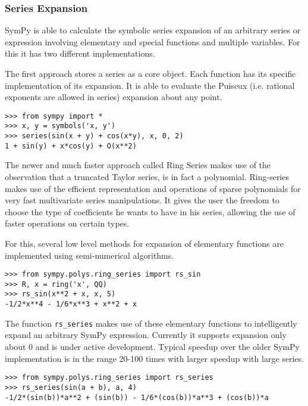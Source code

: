 \subsubsection{Series Expansion}

SymPy is able to calculate the symbolic series expansion of an arbitrary series
or expression involving elementary and special functions and multiple
variables. For this it has two different implementations.

The first approach stores a series as a core object. Each function has its
specific implementation of its expansion. It is able to evaluate the Puiseux
(i.e. rational exponents are allowed in series) expansion about any point.

\begin{verbatim}
>>> from sympy import *
>>> x, y = symbols('x, y')
>>> series(sin(x + y) + cos(x*y), x, 0, 2)
1 + sin(y) + x*cos(y) + O(x**2)
\end{verbatim}

The newer and much faster approach called Ring Series makes use of the
observation that a truncated Taylor series, is in fact a polynomial.
Ring-series makes use of the efficient representation and operations of sparse
polynomials for very fast multivariate series manipulations. It gives the user
the freedom to choose the type of coefficients he wants to have in his series,
allowing the use of faster operations on certain types.

For this, several low level methods for expansion of elementary functions are
implemented using semi-numerical algorithms.

\begin{verbatim}
>>> from sympy.polys.ring_series import rs_sin
>>> R, x = ring('x', QQ)
>>> rs_sin(x**2 + x, x, 5)
-1/2*x**4 - 1/6*x**3 + x**2 + x
\end{verbatim}

The function \texttt{rs\_series} makes use of these elementary functions to
intelligently expand an arbitrary SymPy expression. Currently it supports
expansion only about 0 and is under active development. Typical speedup over
the older SymPy implementation is in the range 20-100 times with larger
speedup with large series.

\begin{verbatim}
>>> from sympy.polys.ring_series import rs_series
>>> rs_series(sin(a + b), a, 4)
-1/2*(sin(b))*a**2 + (sin(b)) - 1/6*(cos(b))*a**3 + (cos(b))*a
\end{verbatim}

